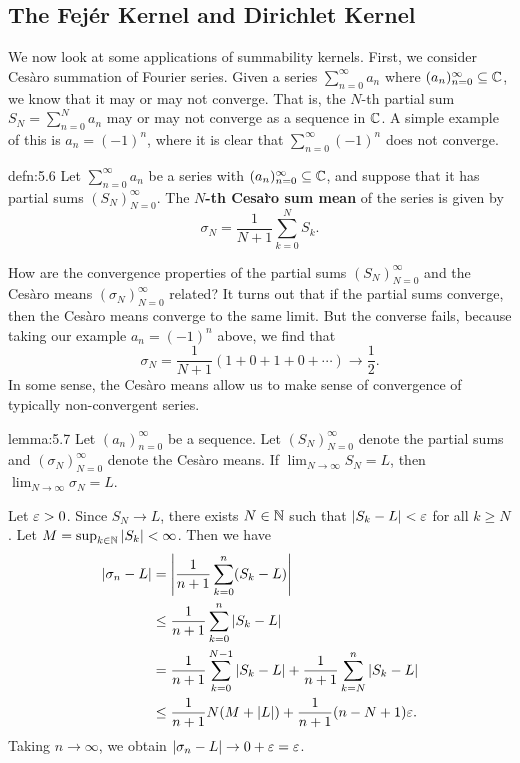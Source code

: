 \subsection{The Fej\'er Kernel and Dirichlet Kernel} \label{subsec:5.3}
We now look at some applications of summability kernels. First, we consider 
Ces\`aro summation of Fourier series. Given a series $\sum_{n=0}^\infty a_n$
where $(a_n)_{n=0}^\infty \subseteq \mathbb{C}$, we know that it may or may not converge. 
That is, the $N$-th partial sum $S_N = \sum_{n=0}^N a_n$ may or may not converge 
as a sequence in $\mathbb{C}$. A simple example of this is $a_n = (-1)^n$, where it is 
clear that $\sum_{n=0}^\infty (-1)^n$ does not converge. 

\begin{defn}{defn:5.6}
    Let $\sum_{n=0}^\infty a_n$ be a series with $(a_n)_{n=0}^\infty \subseteq \mathbb{C}$, 
    and suppose that it has partial sums $(S_N)_{N=0}^\infty$. The 
    {\bf $N$-th Cesa\`ro sum mean} of the series is given by 
    \[ \sigma_N = \frac{1}{N+1} \sum_{k=0}^N S_k. \] 
\end{defn}

How are the convergence properties of the partial sums $(S_N)_{N=0}^\infty$ 
and the Ces\`aro means $(\sigma_N)_{N=0}^\infty$ related? It turns out 
that if the partial sums converge, then the Ces\`aro means converge to the 
same limit. But the converse fails, because taking our example $a_n = (-1)^n$ 
above, we find that 
\[ \sigma_N = \frac{1}{N+1}(1 + 0 + 1 + 0 + \cdots) \to \frac12. \] 
In some sense, the Ces\`aro means allow us to make sense of convergence of 
typically non-convergent series. 

\begin{lemma}{lemma:5.7}
    Let $(a_n)_{n=0}^\infty$ be a sequence. Let $(S_N)_{N=0}^\infty$ denote the 
    partial sums and $(\sigma_N)_{N=0}^\infty$ denote the Ces\`aro means. 
    If $\lim_{N\to\infty} S_N = L$, then $\lim_{N\to\infty} \sigma_N = L$. 
\end{lemma}
\begin{pf}
    Let $\varepsilon > 0$. Since $S_N \to L$, there exists $N \in \mathbb{N}$ such that 
    $|S_k - L| < \varepsilon$ for all $k \geq N$. Let $M = \sup_{k\in\mathbb{N}} |S_k| < \infty$. 
    Then we have 
    \begin{align*}
        |\sigma_n - L| &= \left| \frac{1}{n+1} \sum_{k=0}^n (S_k - L) \right| \\
        &\leq \frac{1}{n+1} \sum_{k=0}^n |S_k - L| \\ 
        &= \frac{1}{n+1} \sum_{k=0}^{N-1} |S_k - L| + \frac{1}{n+1} \sum_{k=N}^n |S_k - L| \\ 
        &\leq \frac{1}{n+1} N(M + |L|) + \frac{1}{n+1} (n - N + 1)\varepsilon . 
    \end{align*}
    Taking $n \to \infty$, we obtain $|\sigma_n - L| \to 0 + \varepsilon = \varepsilon$. 
\end{pf}

